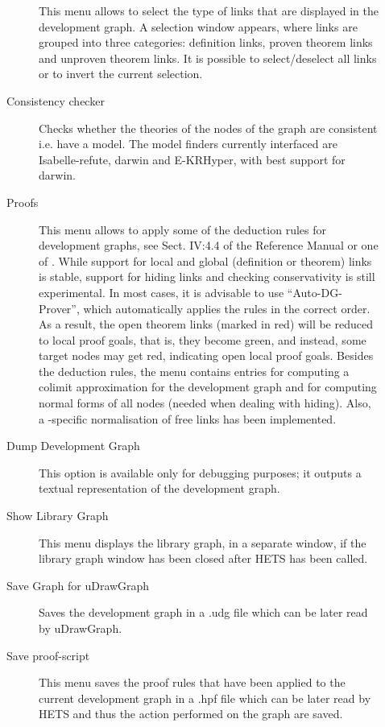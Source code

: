 \documentclass{article}
\newcommand{\normalTEXTSC}[2]{{#1\scriptsize#2}}
\newcommand     {\Hets}{\normalTEXTSC{H}{ETS}\xspace}
\begin{document}
\begin{description}
\begin{description}
This menu allows to select the type of links that are displayed in the
development graph. A selection window appears, where links are grouped into
three categories: definition links, proven theorem links and unproven
theorem links. It is possible to select/deselect all links or to invert the
current selection.

\item[Consistency checker]

  Checks whether the theories of the nodes of the graph are consistent
  i.e. have a model. The model finders currently interfaced are
  Isabelle-refute, darwin and E-KRHyper, with best support for darwin.

\item[Proofs] This menu allows to apply some of the deduction rules
  for development graphs, see Sect. IV:4.4 of the \CASL Reference
  Manual \cite{CASL/RefManual} or one of
  \cite{Habil,MossakowskiEtAl05,MossakowskiEtAl07b}. While support for
  local and global (definition or theorem) links is stable, support
  for hiding links and checking conservativity is still experimental.
  In most cases, it is advisable to use ``Auto-DG-Prover'', which
  automatically applies the rules in the correct order. As a result,
  the open theorem links (marked in red) will be reduced to local
  proof goals, that is, they become green, and instead, some target nodes
  may get red, indicating open local proof goals.
  Besides the deduction rules, the menu contains entries for computing
  a colimit approximation for the development graph and for
  computing normal forms of all nodes (needed when dealing with hiding).
  Also, a \CASL-specific normalisation of free links has been
  implemented.

\item[Dump Development Graph] This option is available only for
 debugging purposes; it outputs a textual representation
 of the development graph.

\item[Show Library Graph] This menu displays the library graph, in a separate
  window, if the library graph window has been closed after \Hets has been
  called.

\item[Save Graph for uDrawGraph] Saves the development graph in a .udg file
 which can be later read by uDrawGraph.

\item[Save proof-script] This menu saves the proof rules that have been applied
 to the current development graph in a .hpf file which can be later read by
 \Hets and thus the action performed on the graph are saved.


\end{description}
\end{description}
\end{document}
